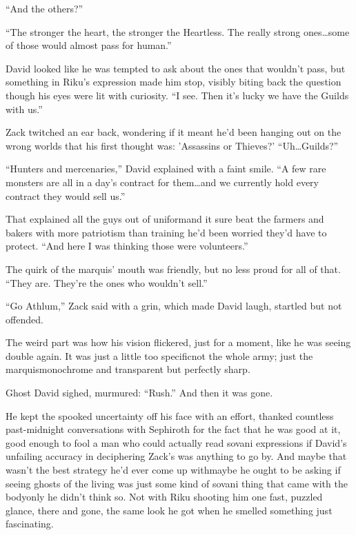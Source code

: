 ``And the others?''

``The stronger the heart, the stronger the Heartless. The really strong ones\ldots some of those would almost pass for human.''

David looked like he was tempted to ask about the ones that wouldn't pass, but something in Riku's expression made him stop, visibly biting back the question though his eyes were lit with curiosity. ``I see. Then it's lucky we have the Guilds with us.''

Zack twitched an ear back, wondering if it meant he'd been hanging out on the wrong worlds that his first thought was: 'Assassins or Thieves?' ``Uh\ldots Guilds?''

``Hunters and mercenaries,'' David explained with a faint smile. ``A few rare monsters are all in a day's contract for them\ldots and we currently hold every contract they would sell us.''

That explained all the guys out of uniform\textemdash and it sure beat the farmers and bakers with more patriotism than training he'd been worried they'd have to protect. ``And here I was thinking those were volunteers.''

The quirk of the marquis' mouth was friendly, but no less proud for all of that. ``They are. They're the ones who wouldn't sell.''

``Go Athlum,'' Zack said with a grin, which made David laugh, startled but not offended.

The weird part was how his vision flickered, just for a moment, like he was seeing double again. It was just a little too specific\textemdash not the whole army; just the marquis\textemdash monochrome and transparent but perfectly sharp.

Ghost David sighed, murmured: ``Rush.'' And then it was gone.

He kept the spooked uncertainty off his face with an effort, thanked countless past-midnight conversations with Sephiroth for the fact that he was good at it, good enough to fool a man who could actually read sovani expressions if David's unfailing accuracy in deciphering Zack's was anything to go by. And maybe that wasn't the best strategy he'd ever come up with\textemdash maybe he ought to be asking if seeing ghosts of the living was just some kind of sovani thing that came with the body\textemdash only he didn't think so. Not with Riku shooting him one fast, puzzled glance, there and gone, the same look he got when he smelled something just fascinating.

